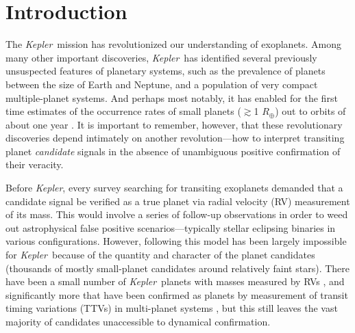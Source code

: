 \documentclass{emulateapj}
\newcommand{\kepler}{\textit{Kepler}}
\begin{document}

\keywords{}


\section{Introduction}

The \kepler\ mission has revolutionized our understanding of
exoplanets.  Among many other important discoveries, \kepler\ has
identified several previously unsuspected features of planetary
systems, such as the prevalence of planets between the size of Earth
and Neptune, and a population of very compact multiple-planet systems.
And perhaps most notably, it has enabled for the first time estimates
of the occurrence rates of small planets ($\gtrsim$1 $R_\oplus$) out
to orbits of about one year
\citep[e.g.][]{Petigura:2013,DFM:2014,Burke:2015}.  It is important to
remember, however, that these revolutionary discoveries depend
intimately on another revolution---how to interpret transiting planet
\textit{candidate} signals in the absence of unambiguous positive
confirmation of their veracity.

Before \kepler, every survey searching for transiting exoplanets
demanded that a candidate signal be verified as a true planet via
radial velocity (RV) measurement of its mass.  This would involve a
series of follow-up observations in order to weed out astrophysical
false positive scenarios---typically stellar eclipsing binaries in
various configurations.  However, following this model has been
largely impossible for \kepler\ because of the quantity and character
of the planet candidates (thousands of mostly small-planet candidates
around relatively faint stars).  There have been a small number of
\kepler\ planets with masses measured by RVs
\citep[e.g.,][]{Marcy:2014,Santerne:2015}, and significantly more that
have been confirmed as planets by measurement of transit timing
variations (TTVs) in multi-planet systems
\citep[e.g.,][]{Ford:2012,Steffen:2012,Fabrycky:2012,Steffen:2013},
but this still leaves the vast majority of candidates unaccessible to
dynamical confirmation.
\end{document}
